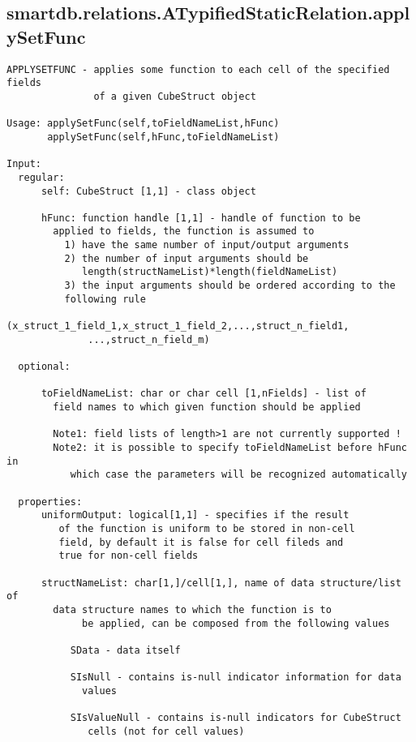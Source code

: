 \subsection{\texorpdfstring{smartdb.relations.ATypifiedStaticRelation.applySetFunc}{applySetFunc}}\label{method:smartdb.relations.ATypifiedStaticRelation.applySetFunc}
\begin{verbatim}
APPLYSETFUNC - applies some function to each cell of the specified fields
               of a given CubeStruct object

Usage: applySetFunc(self,toFieldNameList,hFunc)
       applySetFunc(self,hFunc,toFieldNameList)

Input:
  regular:
      self: CubeStruct [1,1] - class object

      hFunc: function handle [1,1] - handle of function to be
        applied to fields, the function is assumed to
          1) have the same number of input/output arguments
          2) the number of input arguments should be
             length(structNameList)*length(fieldNameList)
          3) the input arguments should be ordered according to the
          following rule
              (x_struct_1_field_1,x_struct_1_field_2,...,struct_n_field1,
              ...,struct_n_field_m)

  optional:

      toFieldNameList: char or char cell [1,nFields] - list of
        field names to which given function should be applied

        Note1: field lists of length>1 are not currently supported !
        Note2: it is possible to specify toFieldNameList before hFunc in
           which case the parameters will be recognized automatically

  properties:
      uniformOutput: logical[1,1] - specifies if the result
         of the function is uniform to be stored in non-cell
         field, by default it is false for cell fileds and
         true for non-cell fields

      structNameList: char[1,]/cell[1,], name of data structure/list of
        data structure names to which the function is to
             be applied, can be composed from the following values

           SData - data itself

           SIsNull - contains is-null indicator information for data
             values

           SIsValueNull - contains is-null indicators for CubeStruct
              cells (not for cell values)


\end{verbatim}
